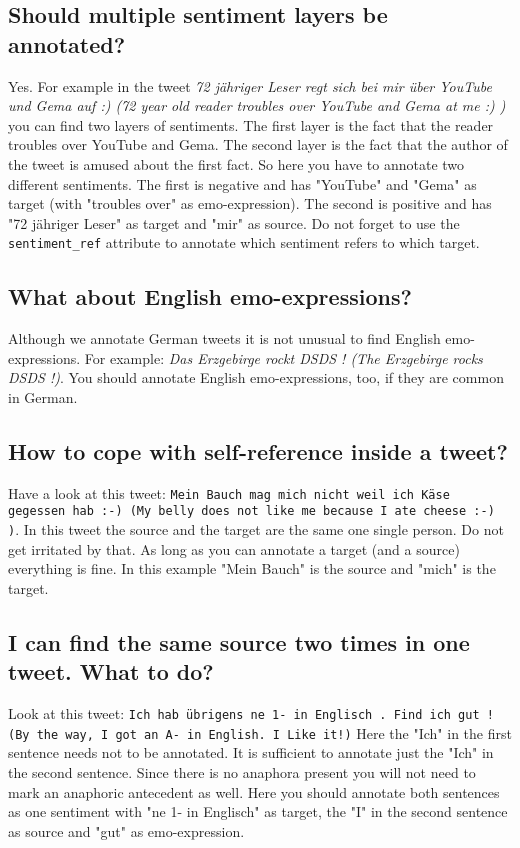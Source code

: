 \documentclass[11pt,a4paper]{article}
\begin{document}
\subsection{Should multiple sentiment layers be annotated?}
Yes. For example in the tweet \textit{72 jähriger Leser regt sich bei mir über YouTube und Gema auf :) (72 year old reader troubles over YouTube and Gema at me :) )} you can find two layers of sentiments. The first layer is the fact that the reader troubles over YouTube and Gema. The second layer is the fact that the author of the tweet is amused about the first fact. So here you have to annotate two different sentiments. The first is negative and has "YouTube" and "Gema" as target (with "troubles over" as emo-expression). The second is positive and has "72 jähriger Leser" as target and "mir" as source. Do not forget to use the \texttt{sentiment\_ref} attribute to annotate which sentiment refers to which target.

\subsection{What about English emo-expressions?}
Although we annotate German tweets it is not unusual to find English emo-expressions. For example: \textit{Das Erzgebirge rockt DSDS ! (The Erzgebirge rocks DSDS !)}. You should annotate English emo-expressions, too, if they are common in German.

\subsection{How to cope with self-reference inside a tweet?}
Have a look at this tweet: \texttt{Mein Bauch mag mich nicht weil ich Käse gegessen hab :-) (My belly does not like me because I ate cheese :-) )}. In this tweet the source and the target are the same one single person. Do not get irritated by that. As long as you can annotate a target (and a source) everything is fine. In this example "Mein Bauch" is the source and "mich" is the target.

\subsection{I can find the same source two times in one tweet. What to do?}
Look at this tweet: \texttt{Ich hab übrigens ne 1-  in Englisch . Find ich gut ! (By the way, I got an A- in English. I Like it!)}
Here the "Ich" in the first sentence needs not to be annotated. It is sufficient to annotate just the "Ich" in the second sentence. Since there is no anaphora present you will not need to mark an anaphoric antecedent as well. \newline
Here you should annotate both sentences as one sentiment with "ne 1- in Englisch" as target, the "I" in the second sentence as source and "gut" as emo-expression.


\end{document}
